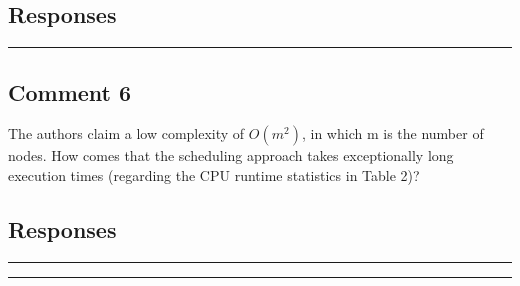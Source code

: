 \documentclass[10pt,journal, compsoc]{IEEEtran}
\begin{document}
\subsection*{Responses}



\noindent\rule[0.25\baselineskip]{252pt}{1pt}



\subsection*{Comment 6}
The authors claim a low complexity of $O(m^2)$, in which m is the number of nodes. How comes that the scheduling approach takes exceptionally long execution times (regarding the CPU runtime statistics in Table 2)?

\subsection*{Responses}





\noindent\rule[0.25\baselineskip]{252pt}{1pt}
\noindent\rule[0.25\baselineskip]{252pt}{1pt}

\end{document}
